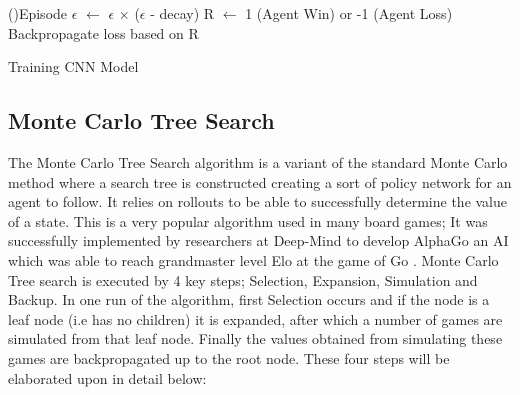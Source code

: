 \documentclass[a4paper,12pt,table]{article}
\begin{document}
\begin{algorithm}[H]
    \SetAlgoLined
    \ForEach(){Episode}{
            $\epsilon$ $\leftarrow$ $\epsilon$ $\times$ ($\epsilon$ - decay)\;
            R $\leftarrow$ 1 (Agent Win) or -1 (Agent Loss)\;
            Backpropagate loss based on R\;          
    }
    \caption{Training CNN Model}
\end{algorithm}

\subsection{Monte Carlo Tree Search}
The Monte Carlo Tree Search algorithm is a variant of the standard Monte Carlo method where a search tree is constructed creating a sort of policy network for an agent to follow. It relies on rollouts to be able to successfully determine the value of a state. This is a very popular algorithm used in many board games; It was successfully implemented by researchers at Deep-Mind to develop AlphaGo an AI which was able to reach grandmaster level Elo at the game of Go \cite{Mastering the game of Go with deep neural networks and tree search}. Monte Carlo Tree search is executed by 4 key steps; Selection, Expansion, Simulation and Backup. In one run of the algorithm, first Selection occurs and if the node is a leaf node (i.e has no children) it is expanded, after which a number of games are simulated from that leaf node. Finally the values obtained from simulating these games are backpropagated up to the root node. These four steps will be elaborated upon in detail below:
\end{document}
